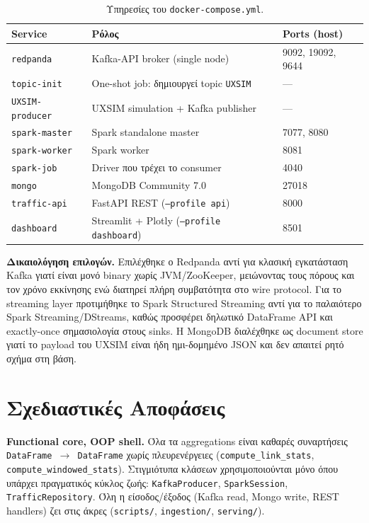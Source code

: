 \documentclass[11pt,a4paper]{article}
\newcommand{\code}[1]{\texttt{\small #1}}
\begin{document}
\begin{table}[h]
\centering\small
\begin{tabular}{@{}lll@{}}
\toprule
\textbf{Service} & \textbf{Ρόλος} & \textbf{Ports (host)} \\
\midrule
\code{redpanda}        & Kafka-API broker (single node)                & 9092, 19092, 9644 \\
\code{topic-init}      & One-shot job: δημιουργεί topic \code{UXSIM}   & --- \\
\code{UXSIM-producer}  & UXSIM simulation + Kafka publisher            & --- \\
\code{spark-master}    & Spark standalone master                       & 7077, 8080 \\
\code{spark-worker}    & Spark worker                                  & 8081 \\
\code{spark-job}       & Driver που τρέχει το consumer                 & 4040 \\
\code{mongo}           & MongoDB Community 7.0                         & 27018 \\
\code{traffic-api}     & FastAPI REST (\code{--profile api})           & 8000 \\
\code{dashboard}       & Streamlit + Plotly (\code{--profile dashboard}) & 8501 \\
\bottomrule
\end{tabular}
\caption{Υπηρεσίες του \code{docker-compose.yml}.}
\label{tab:containers}
\end{table}

\textbf{Δικαιολόγηση επιλογών.} Επιλέχθηκε ο Redpanda αντί για κλασική εγκατάσταση Kafka γιατί είναι μονό binary χωρίς JVM/ZooKeeper, μειώνοντας τους πόρους και τον χρόνο εκκίνησης ενώ διατηρεί πλήρη συμβατότητα στο wire protocol. Για το streaming layer προτιμήθηκε το Spark Structured Streaming αντί για το παλαιότερο Spark Streaming/DStreams, καθώς προσφέρει δηλωτικό DataFrame API και exactly-once σημασιολογία στους sinks. Η MongoDB διαλέχθηκε ως document store γιατί το payload του UXSIM είναι ήδη ημι-δομημένο JSON και δεν απαιτεί ρητό σχήμα στη βάση.

\section{Σχεδιαστικές Αποφάσεις}

\textbf{Functional core, OOP shell.} Όλα τα aggregations είναι καθαρές συναρτήσεις \code{DataFrame $\rightarrow$ DataFrame} χωρίς πλευρενέργειες (\code{compute\_link\_stats}, \code{compute\_windowed\_stats}). Στιγμιότυπα κλάσεων χρησιμοποιούνται μόνο όπου υπάρχει πραγματικός κύκλος ζωής: \code{KafkaProducer}, \code{SparkSession}, \code{TrafficRepository}. Όλη η είσοδος/έξοδος (Kafka read, Mongo write, REST handlers) ζει στις άκρες (\code{scripts/}, \code{ingestion/}, \code{serving/}).
\end{document}
